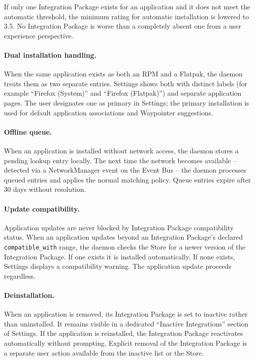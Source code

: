 If only one Integration Package exists for an application and it does not
meet the automatic threshold, the minimum rating for automatic installation
is lowered to 3.5. No Integration Package is worse than a completely absent
one from a user experience perspective.

\paragraph{Dual installation handling.}
When the same application exists as both an RPM and a Flatpak, the daemon
treats them as two separate entries. Settings shows both with distinct labels
(for example ``Firefox (System)'' and ``Firefox (Flatpak)'') and separate
application pages. The user designates one as primary in Settings; the primary
installation is used for default application associations and Waypointer
suggestions.

\paragraph{Offline queue.}
When an application is installed without network access, the daemon stores a
pending lookup entry locally. The next time the network becomes available --
detected via a NetworkManager event on the Event Bus -- the daemon processes
queued entries and applies the normal matching policy. Queue entries expire
after 30 days without resolution.

\paragraph{Update compatibility.}
Application updates are never blocked by Integration Package compatibility
status. When an application updates beyond an Integration Package's declared
\texttt{compatible\_with} range, the daemon checks the Store for a newer
version of the Integration Package. If one exists it is installed
automatically. If none exists, Settings displays a compatibility warning. The
application update proceeds regardless.

\paragraph{Deinstallation.}
When an application is removed, its Integration Package is set to inactive
rather than uninstalled. It remains visible in a dedicated ``Inactive
Integrations'' section of Settings. If the application is reinstalled, the
Integration Package reactivates automatically without prompting. Explicit
removal of the Integration Package is a separate user action available from
the inactive list or the Store.

